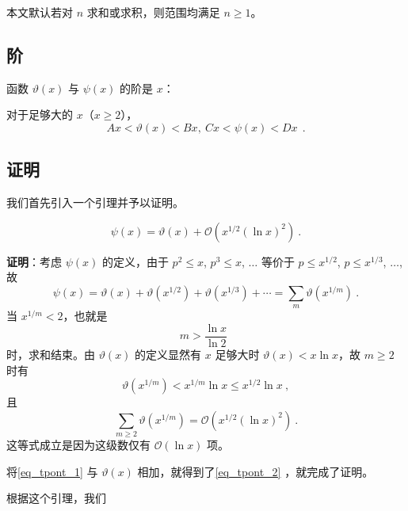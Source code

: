 
本文默认若对 $n$ 求和或求积，则范围均满足 $n \ge 1$。
\subsection{阶}
\begin{theorem}{}
函数 $\vartheta(x)$ 与 $\psi(x)$ 的阶是 $x$：

对于足够大的 $x$（$x \ge 2$），
\begin{equation}
Ax < \vartheta(x) < Bx, ~ Cx < \psi(x) < Dx ~ ~.
\end{equation}

\end{theorem}

\subsection{证明}
我们首先引入一个引理并予以证明。
\begin{lemma}{}
\begin{equation}
\psi(x) = \vartheta(x) + \mathcal O\left( x^{1/2} (\ln x)^{2} \right) ~.
\end{equation}

\end{lemma}
\textbf{证明}：考虑 $\psi(x)$ 的定义，由于 $p^2 \le x$, $p^3 \le x$, $\dots$ 等价于 $p \le x^{1/2}$, $p \le x^{1/3}$, $\dots$, 故
\begin{equation}\label{eq_tpont_2}
\psi(x) = \vartheta(x) + \vartheta(x^{1/2}) + \vartheta(x^{1/3}) + \cdots = \sum_{m} \vartheta(x^{1/m}) ~.
\end{equation}
当 $x^{1/m} < 2$，也就是
\begin{equation}
m > \frac{\ln x}{\ln 2} ~~
\end{equation}
时，求和结束。由 $\vartheta(x)$ 的定义显然有 $x$ 足够大时 $\vartheta(x) < x \ln x$，故 $m \ge 2$ 时有
\begin{equation}
\vartheta(x^{1/m}) < x^{1/m} \ln x \le x^{1/2} \ln x~,
\end{equation}
且
\begin{equation}\label{eq_tpont_1}
\sum_{m \ge 2} \vartheta(x^{1/m}) = \mathcal O\left( x^{1/2} (\ln x)^{2} \right) ~.
\end{equation}
这等式成立是因为这级数仅有 $\mathcal O(\ln x)$ 项。

将\autoref{eq_tpont_1} 与 $\vartheta(x)$ 相加，就得到了\autoref{eq_tpont_2} ，就完成了证明。


根据这个引理，我们

